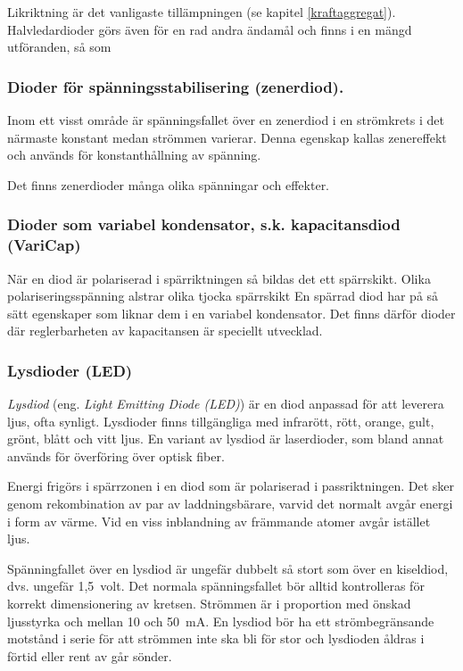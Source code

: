 Likriktning är det vanligaste tillämpningen (se kapitel \ref{kraftaggregat}).
Halvledardioder görs även för en rad andra ändamål och finns i en mängd
utföranden, så som

\subsubsection{Dioder för spänningsstabilisering (zenerdiod).}

  Inom ett visst område är spänningsfallet över en zenerdiod i en strömkrets
  i det närmaste konstant medan strömmen varierar. Denna egenskap kallas
  zenereffekt och används för konstanthållning av spänning.

  Det finns zenerdioder många olika spänningar och effekter.

\subsubsection{Dioder som variabel kondensator, s.k. kapacitansdiod (VariCap)}
\label{varicap}

  När en diod är polariserad i spärriktningen så bildas det ett spärrskikt.
  Olika polariseringsspänning alstrar olika tjocka spärrskikt En spärrad diod
  har på så sätt egenskaper som liknar dem i en variabel kondensator. Det finns
  därför dioder där reglerbarheten av kapacitansen är speciellt utvecklad.

\subsubsection{Lysdioder (LED)}

\emph{Lysdiod} (eng. \emph{Light Emitting Diode (LED)}) är en diod anpassad för
att leverera ljus, ofta synligt.
Lysdioder finns tillgängliga med infrarött, rött, orange, gult, grönt,
blått och vitt ljus.
En variant av lysdiod är laserdioder, som bland annat används för överföring
över optisk fiber.

Energi frigörs i spärrzonen i en diod som är polariserad i passriktningen.
Det sker genom rekombination av par av laddningsbärare, varvid det normalt avgår
energi i form av värme.
Vid en viss inblandning av främmande atomer avgår istället ljus.

Spänningfallet över en lysdiod är ungefär dubbelt så stort som över en
kiseldiod, dvs. ungefär 1,5~volt.
Det normala spänningsfallet bör alltid kontrolleras för korrekt dimensionering
av kretsen.
Strömmen är i proportion med önskad ljusstyrka och mellan 10 och 50~mA.
En lysdiod bör ha ett strömbegränsande motstånd i serie för att strömmen
inte ska bli för stor och lysdioden åldras i förtid eller rent av går
sönder.

